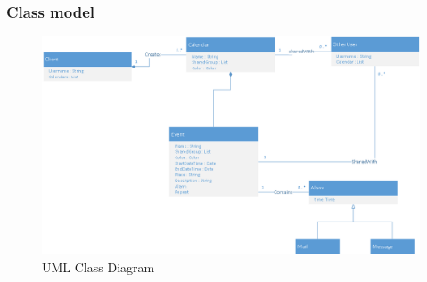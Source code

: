 \newpage
\subsubsection*{Class model}
\begin{figure}[ht!]
\centering
\includegraphics[width=160mm]{Figures/UMLClassModel.png}
\caption{UML Class Diagram \label{overflow}}
\end{figure}